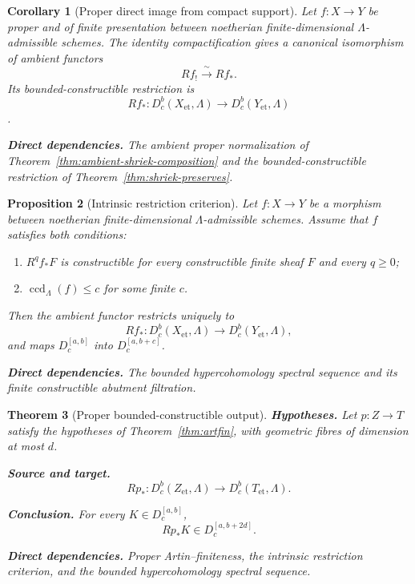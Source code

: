 \documentclass[10pt]{article}
\newtheorem{theorem}{Theorem}[section]
\newtheorem{proposition}[theorem]{Proposition}
\newtheorem{corollary}[theorem]{Corollary}
\theoremstyle{definition}
\newcommand{\Dbc}{D^b_c}
\newcommand{\deps}[1]{\par\smallskip\noindent\textbf{Direct dependencies.} #1}
\begin{document}
\begin{corollary}[Proper direct image from compact support]
\label{cor:proper-star-shriek}
Let $f:X\to Y$ be proper and of finite presentation between noetherian
finite-dimensional $\Lambda$-admissible schemes.  The identity compactification
gives a canonical isomorphism of ambient functors
\[
 Rf_!\xrightarrow{\ \sim\ }Rf_*.
\]
Its bounded-constructible restriction is
\[
 Rf_*:\Dbc(X_{\mathrm{et}},\Lambda)\longrightarrow
       \Dbc(Y_{\mathrm{et}},\Lambda)
\].
\deps{The ambient proper normalization of
Theorem~\ref{thm:ambient-shriek-composition} and the bounded-constructible
restriction of Theorem~\ref{thm:shriek-preserves}.}
\end{corollary}

\begin{proposition}[Intrinsic restriction criterion]
\label{prop:restriction}
Let $f:X\to Y$ be a morphism between noetherian finite-dimensional
$\Lambda$-admissible schemes.  Assume that $f$ satisfies both conditions:
\begin{enumerate}
\item $R^qf_*F$ is constructible for every constructible finite sheaf $F$
      and every $q\geq0$;
\item $\operatorname{ccd}_\Lambda(f)\leq c$ for some finite $c$.
\end{enumerate}
Then the ambient functor restricts uniquely to
\[
 Rf_*:\Dbc(X_{\mathrm{et}},\Lambda)\longrightarrow
       \Dbc(Y_{\mathrm{et}},\Lambda),
\]
and maps $D_c^{[a,b]}$ into $D_c^{[a,b+c]}$.
\deps{The bounded hypercohomology spectral sequence and its finite
constructible abutment filtration.}
\end{proposition}

\begin{theorem}[Proper bounded-constructible output]
\label{thm:proper-output}
\textbf{Hypotheses.} Let $p:Z\to T$ satisfy the hypotheses of
Theorem~\ref{thm:artfin}, with geometric fibres of dimension at most $d$.

\textbf{Source and target.}
\[
 Rp_*:\Dbc(Z_{\mathrm{et}},\Lambda)\longrightarrow
       \Dbc(T_{\mathrm{et}},\Lambda).
\]

\textbf{Conclusion.} For every $K\in D_c^{[a,b]}$,
\[
 Rp_*K\in D_c^{[a,b+2d]}.
\]
\deps{Proper Artin--finiteness, the intrinsic restriction criterion, and the
bounded hypercohomology spectral sequence.}
\end{theorem}
\end{document}

